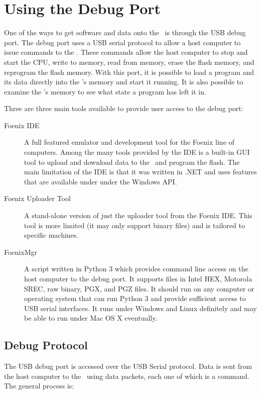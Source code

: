 \chapter{Using the Debug Port}

One of the ways to get software and data onto the \jr\ is through the USB debug port. The debug port uses a USB serial protocol to allow a host computer to issue commands to the \jr. These commands allow the host computer to stop and start the CPU, write to memory, read from memory, erase the flash memory, and reprogram the flash memory. With this port, it is possible to load a program and its data directly into the \jr's memory and start it running. It is also possible to examine the \jr's memory to see what state a program has left it in.

Three are three main tools available to provide user access to the debug port:

\begin{description}
    \item[Foenix IDE] A full featured emulator and development tool for the Foenix line of computers. Among the many tools provided by the IDE is a built-in GUI tool to upload and download data to the \jr\ and program the flash. The main limitation of the IDE is that it was written in .NET and uses features that are available under under the Windows API.

    \item[Foenix Uploader Tool] A stand-alone version of just the uploader tool from the Foenix IDE. This tool is more limited (it may only support binary files) and is tailored to specific machines.

    \item[FoenixMgr] A script written in Python 3 which provides command line access on the host computer to the debug port. It supports files in Intel HEX, Motorola SREC, raw binary, PGX, and PGZ files. It should run on any computer or operating system that can run Python 3 and provide sufficient access to USB serial interfaces. It runs under Windows and Linux definitely and may be able to run under Mac OS X eventually.
\end{description}

\section{Debug Protocol}

The USB debug port is accessed over the USB Serial protocol. Data is sent from the host computer to the \jr\ using data packets, each one of which is a command. The general process is:

